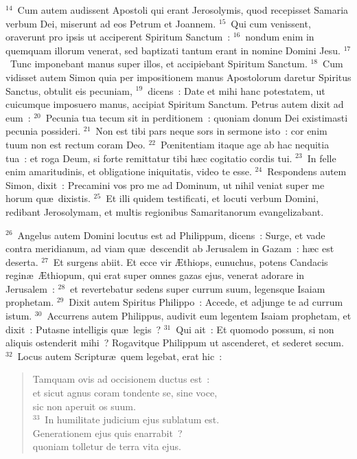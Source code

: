 ${}^{14}$~Cum autem audissent Apostoli qui erant Jerosolymis, quod recepisset Samaria verbum Dei, miserunt ad eos Petrum et Joannem.
${}^{15}$~Qui cum venissent, oraverunt pro ipsis ut acciperent Spiritum Sanctum~:
${}^{16}$~nondum enim in quemquam illorum venerat, sed baptizati tantum erant in nomine Domini Jesu.
${}^{17}$~Tunc imponebant manus super illos, et accipiebant Spiritum Sanctum.
${}^{18}$~Cum vidisset autem Simon quia per impositionem manus Apostolorum daretur Spiritus Sanctus, obtulit eis pecuniam,
${}^{19}$~dicens~: Date et mihi hanc potestatem, ut cuicumque imposuero manus, accipiat Spiritum Sanctum. Petrus autem dixit ad eum~:
${}^{20}$~Pecunia tua tecum sit in perditionem~: quoniam donum Dei existimasti pecunia possideri.
${}^{21}$~Non est tibi pars neque sors in sermone isto~: cor enim tuum non est rectum coram Deo.
${}^{22}$~Pœnitentiam itaque age ab hac nequitia tua~: et roga Deum, si forte remittatur tibi h\ae c cogitatio cordis tui.
${}^{23}$~In felle enim amaritudinis, et obligatione iniquitatis, video te esse.
${}^{24}$~Respondens autem Simon, dixit~: Precamini vos pro me ad Dominum, ut nihil veniat super me horum qu\ae\ dixistis.
${}^{25}$~Et illi quidem testificati, et locuti verbum Domini, redibant Jerosolymam, et multis regionibus Samaritanorum evangelizabant.


${}^{26}$~Angelus autem Domini locutus est ad Philippum, dicens~: Surge, et vade contra meridianum, ad viam qu\ae\ descendit ab Jerusalem in Gazam~: h\ae c est deserta.
${}^{27}$~Et surgens abiit. Et ecce vir \AE thiops, eunuchus, potens Candacis regin\ae\ \AE thiopum, qui erat super omnes gazas ejus, venerat adorare in Jerusalem~:
${}^{28}$~et revertebatur sedens super currum suum, legensque Isaiam prophetam.
${}^{29}$~Dixit autem Spiritus Philippo~: Accede, et adjunge te ad currum istum.
${}^{30}$~Accurrens autem Philippus, audivit eum legentem Isaiam prophetam, et dixit~: Putasne intelligis qu\ae\ legis~?
${}^{31}$~Qui ait~: Et quomodo possum, si non aliquis ostenderit mihi~? Rogavitque Philippum ut ascenderet, et sederet secum.
${}^{32}$~Locus autem Scriptur\ae\ quem legebat, erat hic~: \begin{flushleft}\begin{verse}Tamquam ovis ad occisionem ductus est~:\\ et sicut agnus coram tondente se, sine voce,\\ sic non aperuit os suum.\\
${}^{33}$~In humilitate judicium ejus sublatum est.\\ Generationem ejus quis enarrabit~?\\ quoniam tolletur de terra vita ejus.\end{verse}\end{flushleft}


